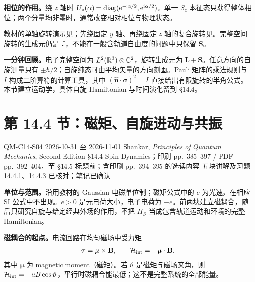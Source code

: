 \textbf{相位的作用。}绕 $z$ 轴时 $U_z(\alpha)=\operatorname{diag}(\mathrm{e}^{-\mathrm{i}\alpha/2},\mathrm{e}^{\mathrm{i}\alpha/2})$。单一 $S_z$ 本征态只获得整体相位；两个分量均非零时，通常改变相对相位与物理状态。


教材的单轴旋转演示见；先绕固定 $y$ 轴、再绕固定 $z$ 轴的复合旋转见。完整空间旋转的生成元仍是 $\mathbf J$，不能在一般含轨道自由度的问题中只保留 $\mathbf S$。

\textbf{一分钟回顾。}电子完整空间为 $L^2(\mathbb{R}^3)\otimes\mathbb{C}^2$，旋转生成元为 $\mathbf L+\mathbf S$。任意方向的自旋测量只有 $\pm\hbar/2$；自旋纯态可由平均矢量的方向刻画。Pauli 矩阵的乘法规则与 $I$ 构成二阶算符的计算工具，其中 $(\hat{\mathbf n}\cdot\boldsymbol\sigma)^2=I$ 直接给出有限旋转的半角公式。本节建立运动学，具体自旋 Hamiltonian 与时间演化留到 \S 14.4。

\section{第 14.4 节：磁矩、自旋进动与共振}
\label{section:QM-C14-S04}
\studymeta
  {QM-C14-S04}
  {2026-10-31 至 2026-11-01}
  {Shankar, \textit{Principles of Quantum Mechanics}, Second Edition}
  {\S 14.4 Spin Dynamics；印刷 pp.~385--397 / PDF pp.~392--404，至 \S 14.5 标题前；含印刷 pp.~394--395 的选读内容}
  {五块讲解及习题 14.4.1、14.4.3 已核对；笔记已确认}

\textbf{单位与范围。}沿用教材的 Gaussian 电磁单位制；磁矩公式中的 $c$ 为光速，在相应 SI 公式中不出现。$e>0$ 是元电荷大小，电子电荷为 $-e$。前两块建立磁耦合，随后只研究自旋与给定经典外场的作用，不把 $H_S$ 当成包含轨道运动和环境的完整 Hamiltonian。


\textbf{磁耦合的起点。}电流回路在均匀磁场中受力矩
\begin{equation}
  \boldsymbol\tau=\boldsymbol\mu\times\mathbf B,\qquad
  \mathcal H_{\rm int}=-\boldsymbol\mu\cdot\mathbf B.
\end{equation}
其中 $\boldsymbol\mu$ 为 magnetic moment（磁矩）。若 $\vartheta$ 是磁矩与磁场夹角，则 $\mathcal H_{\rm int}=-\mu B\cos\vartheta$，平行时磁耦合能最低；这不是完整系统的全部能量。

